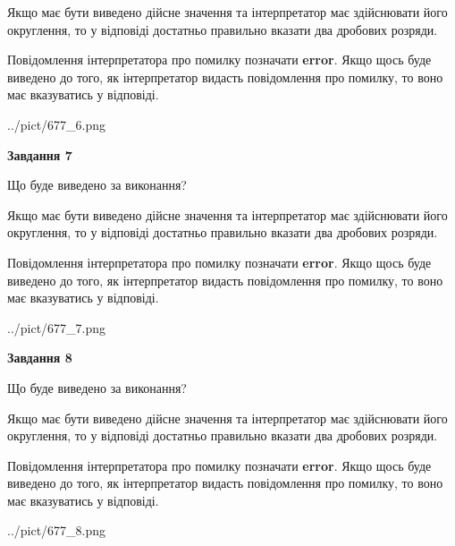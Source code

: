 \documentclass[12pt, ukrainian]{article}
\begin{document}
{\begin {Large}
Якщо має бути виведено дійсне значення та інтерпретатор має здійснювати його округлення, 
то у відповіді достатньо правильно вказати два дробових розряди.

Повідомлення інтерпретатора про помилку позначати \textbf{error}.
Якщо щось буде виведено до того, як інтерпретатор видасть повідомлення про помилку, 
то воно має вказуватись у відповіді. \par

\begin{center}
	{../pict/677_6.png}
\end{center}
\newpage

{\begin {center}\textbf{Завдання 7}\end {center}}\par
Що буде виведено за виконання? \par

Якщо має бути виведено дійсне значення та інтерпретатор має здійснювати його округлення, 
то у відповіді достатньо правильно вказати два дробових розряди.

Повідомлення інтерпретатора про помилку позначати \textbf{error}.
Якщо щось буде виведено до того, як інтерпретатор видасть повідомлення про помилку, 
то воно має вказуватись у відповіді. \par

\begin{center}
	{../pict/677_7.png}
\end{center}
\newpage

{\begin {center}\textbf{Завдання 8}\end {center}}\par
Що буде виведено за виконання? \par

Якщо має бути виведено дійсне значення та інтерпретатор має здійснювати його округлення, 
то у відповіді достатньо правильно вказати два дробових розряди.

Повідомлення інтерпретатора про помилку позначати \textbf{error}.
Якщо щось буде виведено до того, як інтерпретатор видасть повідомлення про помилку, 
то воно має вказуватись у відповіді. \par

\begin{center}
	{../pict/677_8.png}
\end{center}
\newpage


\end{Large}}
\end{document}

